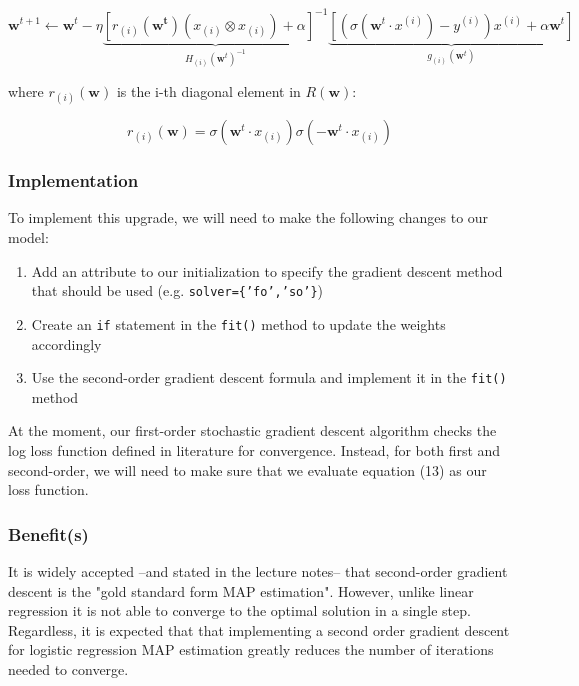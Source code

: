 \documentclass[12pt]{extarticle}
\begin{document}
\begin{equation}
\mathbf{w}^{t+1} \leftarrow \mathbf{w}^{t} - \eta \underbrace{\left[r_{(i)}(\mathbf{w^t}) (x_{(i)} \otimes x_{(i)}) + \alpha \right]^{-1}}_{H_{(i)}(\mathbf{w}^t)^{-1}} \underbrace{\left[ \left(\sigma(\mathbf{w}^t \cdot x^{(i)}) - y^{(i)}\right) x^{(i)} + \alpha \mathbf{w}^{t} \right]}_{g_{(i)}(\mathbf{w}^t)}
\end{equation}

where $r_{(i)}(\mathbf{w})$ is the i-th diagonal element in $R(\mathbf{w})$:

\begin{equation}
r_{(i)}(\mathbf{w}) = \sigma(\textbf{w}^t \cdot x_{(i)})\sigma(-\textbf{w}^t \cdot x_{(i)})
\end{equation}


\subsubsection{Implementation}

To implement this upgrade, we will need to make the following changes to our model:

\begin{enumerate}
\item Add an attribute to our initialization to specify the gradient descent method that should be used (e.g. \texttt{solver=\{'fo','so'\}})
\item Create an \texttt{if} statement in the \texttt{fit()} method to update the weights accordingly
\item Use the second-order gradient descent formula and implement it in the \texttt{fit()} method 
\end{enumerate}

At the moment, our first-order stochastic gradient descent algorithm checks the log loss function defined in literature for convergence. Instead, for both first and second-order, we will need to make sure that we evaluate equation (13) as our loss function.


\subsubsection{Benefit(s)}

It is widely accepted –and stated in the lecture notes– that second-order gradient descent is the "gold standard form MAP estimation". However, unlike linear regression it is not able to converge to the optimal solution in a single step. Regardless, it is expected that that implementing a second order gradient descent for logistic regression MAP estimation greatly reduces the number of iterations needed to converge.
\end{document}
